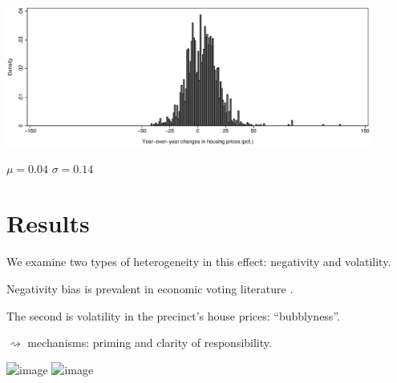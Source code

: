 \documentclass[aspectratio=169]{beamer}
\begin{document}
\begin{frame}
\begin{center}
\includegraphics[width=0.9\textwidth]{../../figures/hphist.eps}	

$\mu=0.04$ \hspace{0.1in} $\sigma=0.14$
\end{center}
\end{frame}	


\section{Results}
\begin{frame}
	\footnotesize
\end{frame}		

\begin{frame}
We examine two types of heterogeneity in this effect: negativity and volatility.

\vspace{0.3in} \pause

Negativity bias is prevalent in economic voting literature \citep[e.g.][]{bloom1975voter}.

\vspace{0.3in} \pause

The second is volatility in the precinct's house prices: ``bubblyness''.


$\rightsquigarrow$ mechanisms: priming and clarity of responsibility.

\end{frame}	
\begin{frame}
\begin{center}
	\includegraphics<1>[width=0.6\textwidth]{../../figures/posnegplot}
	\includegraphics<2>[width=0.6\textwidth]{../../figures/volaplot}
\end{center}

\end{frame}	
\end{document}

